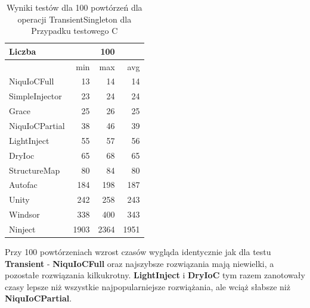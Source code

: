 \documentclass[12pt]{article}
\begin{document}
\begin{table}[H]
\captionsetup{belowskip=0pt,aboveskip=0pt}
\begin{center}
\begin{small}
	\begin{tabular}{ | l | r r r | }
    		\hline
Liczba & & 100 & \\ \hline
 & min & max & avg \\ \hline
NiquIoCFull & 13 & 14 & 14 \\ \hline
SimpleInjector & 23 & 24 & 24 \\ \hline
Grace & 25 & 26 & 25 \\ \hline
NiquIoCPartial & 38 & 46 & 39 \\ \hline
LightInject & 55 & 57 & 56 \\ \hline
DryIoc & 65 & 68 & 65 \\ \hline
StructureMap & 80 & 84 & 80 \\ \hline
Autofac & 184 & 198 & 187 \\ \hline
Unity & 242 & 258 & 243 \\ \hline
Windsor & 338 & 400 & 343 \\ \hline
Ninject & 1903 & 2364 & 1951 \\ \hline
  	\end{tabular}
\end{small}
\end{center}
\caption{Wyniki testów dla 100 powtórzeń dla operacji TransientSingleton dla Przypadku testowego C}
\label{TestCaseC_TransientSingleton100}
\end{table}
Przy 100 powtórzeniach wzrost czasów wygląda identycznie jak dla testu \textbf{Transient} - \textbf{NiquIoCFull} oraz najszybsze rozwiązania mają niewielki, a pozostałe rozwiązania kilkukrotny. \textbf{LightInject} i \textbf{DryIoC} tym razem zanotowały czasy lepsze niż wszystkie najpopularniejsze rozwiążania, ale wciąż słabsze niż \textbf{NiquIoCPartial}.
\\ \\
\end{document}
